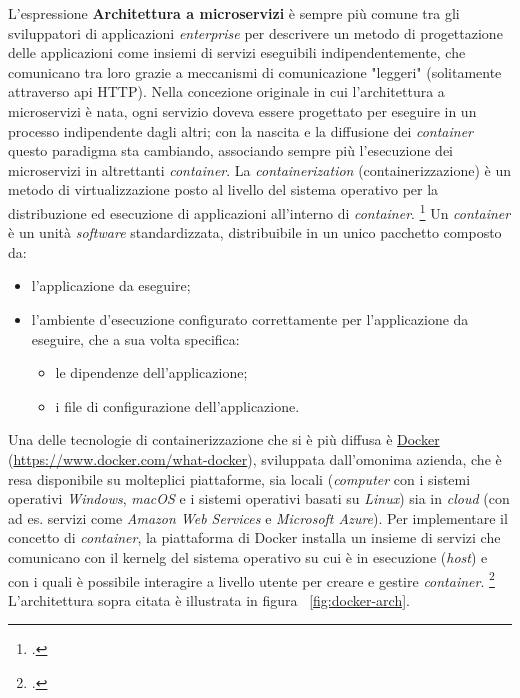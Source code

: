 L'espressione \textbf{Architettura a microservizi} è sempre più comune tra gli sviluppatori di applicazioni \textit{enterprise} per descrivere un metodo di progettazione delle applicazioni come insiemi di servizi eseguibili indipendentemente, che comunicano tra loro grazie a meccanismi di comunicazione "leggeri" (solitamente attraverso \gls{api} HTTP).
Nella concezione originale in cui l'architettura a microservizi è nata, ogni servizio doveva essere progettato per eseguire in un processo indipendente dagli altri; con la nascita e la diffusione dei \emph{container} questo paradigma sta cambiando, associando sempre più l'esecuzione dei microservizi in altrettanti \emph{container}.
La \emph{containerization} (containerizzazione) è un metodo di virtualizzazione posto al livello del sistema operativo per la distribuzione ed esecuzione di applicazioni all'interno di \emph{container}.
\footcite{site:containerization}
Un \emph{container} è un unità \emph{software} standardizzata, distribuibile in un unico pacchetto composto da:
\begin{itemize}
  \itemsep0em
  \item l'applicazione da eseguire;
  \item l'ambiente d'esecuzione configurato correttamente per l'applicazione da eseguire, che a sua volta specifica:
  \begin{itemize}
    \item le dipendenze dell'applicazione;
    \item i file di configurazione dell'applicazione.
  \end{itemize}
\end{itemize}
Una delle tecnologie di containerizzazione che si è più diffusa è \href{https://www.docker.com/what-docker}{Docker} (\url{https://www.docker.com/what-docker}), sviluppata dall'omonima azienda, che è resa disponibile su molteplici piattaforme, sia locali (\emph{computer} con i sistemi operativi \emph{Windows}, \emph{macOS} e i sistemi operativi basati su \emph{Linux}) sia in \emph{cloud} (con ad es. servizi come \emph{Amazon Web Services} e \emph{Microsoft Azure}).
Per implementare il concetto di \emph{container}, la piattaforma di Docker installa un insieme di servizi che comunicano con il \gls{kernelg} del sistema operativo su cui è in esecuzione (\emph{host}) e con i quali è possibile interagire a livello utente per creare e gestire \emph{container}.
\footcite{site:docker-container}
L'architettura sopra citata è illustrata in figura ~\ref{fig:docker-arch}.

